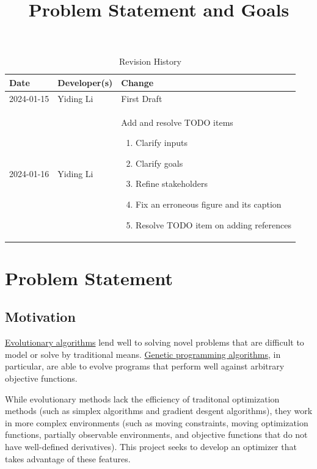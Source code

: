\documentclass{article}
\title{Problem Statement and Goals\\\progname}
\author{\authname}
\date{}
\begin{document}
\maketitle

\begin{table}[hp]
\caption{Revision History} \label{TblRevisionHistory}
\begin{tabularx}{\textwidth}{llX}
\toprule
\textbf{Date} & \textbf{Developer(s)} & \textbf{Change}\\
\midrule
2024-01-15 & Yiding Li & First Draft\\
2024-01-16 & Yiding Li & Add and resolve TODO items
\begin{enumerate}
    \item Clarify inputs
    \item Clarify goals
    \item Refine stakeholders
    \item Fix an erroneous figure and its caption
    \item Resolve TODO item on adding references
\end{enumerate}
\\
\bottomrule
\end{tabularx}
\end{table}

\section{Problem Statement}


\subsection{Motivation}


\hyperref[sec:evalg]{Evolutionary algorithms} lend well to solving novel problems that are difficult to model or solve by traditional means. \hyperref[sec:genalg]{Genetic programming algorithms}, in particular, are able to evolve programs that perform well against arbitrary objective functions.

While evolutionary methods lack the efficiency of traditonal optimization methods (such as simplex algorithms and gradient desgent algorithms), they work in more complex environments (such as moving constraints, moving optimization functions, partially observable environments, and objective functions that do not have well-defined derivatives). This project seeks to develop an optimizer that takes advantage of these features.
\end{document}
